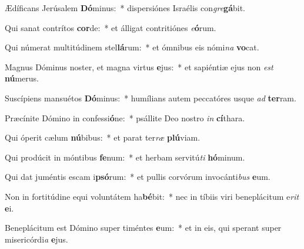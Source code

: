 \item Ædíficans Jerúsalem \textbf{Dó}minus:~* dispersiónes Israélis con\textit{gre}\textbf{gá}bit.
\item Qui sanat contrítos \textbf{cor}de:~* et álligat contritiónes \textit{e}\textbf{ó}rum.
\item Qui númerat multitúdinem stel\textbf{lá}rum:~* et ómnibus eis nómi\textit{na} \textbf{vo}cat.
\item Magnus Dóminus noster, et magna virtus \textbf{e}jus:~* et sapiéntiæ ejus non \textit{est} \textbf{nú}merus.
\item Suscípiens mansuétos \textbf{Dó}minus:~* humílians autem peccatóres usque \textit{ad} \textbf{ter}ram.
\item Præcínite Dómino in confessi\textbf{ó}ne:~* psállite Deo nostro \textit{in} \textbf{cí}thara.
\item Qui óperit cælum \textbf{nú}bibus:~* et parat ter\textit{ræ} \textbf{plú}viam.
\item Qui prodúcit in móntibus \textbf{fe}num:~* et herbam servitú\textit{ti} \textbf{hó}minum.
\item Qui dat juméntis escam i\textbf{psó}rum:~* et pullis corvórum invocánti\textit{bus} \textbf{e}um.
\item Non in fortitúdine equi voluntátem ha\textbf{bé}bit:~* nec in tíbiis viri beneplácitum e\textit{rit} \textbf{e}i.
\item Beneplácitum est Dómino super timéntes \textbf{e}um:~* et in eis, qui sperant super misericórdi\hspace{0.04em}\textit{a} \textbf{e}jus.
